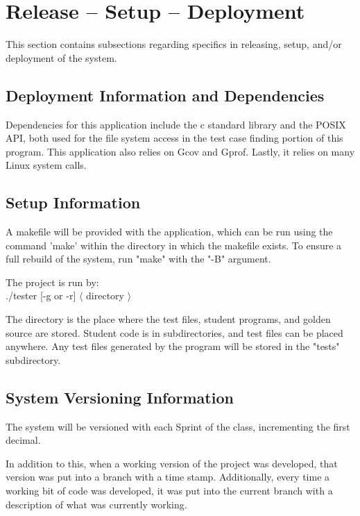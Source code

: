 
\chapter{Release -- Setup -- Deployment}
This section contains subsections regarding specifics in releasing, 
setup, and/or deployment of the system. 


\section{Deployment Information and Dependencies}
Dependencies for this application include the c standard library and the POSIX API, both used for the
file system access in the test case finding portion of this program. This application also relies on Gcov and Gprof. Lastly, it relies on many Linux system calls.



\section{Setup Information}
A makefile will be provided with the application, which can be run using the command 'make' within the 
directory in which the makefile exists. To ensure a full rebuild of the system, run "make" with the "-B" argument.

The project is run by: \\
./tester [-g or -r] $\langle$ directory $\rangle$

The directory is the place where the test files, student programs, and golden source are stored. Student code is in subdirectories, and test files can be placed anywhere. Any test files generated by the program will be stored in the "tests" subdirectory.


\section{System  Versioning Information}
The system will be versioned with each Sprint of the class, incrementing the first decimal.

In addition to this, when a working version of the project was developed, that version was put into a branch with a time stamp. 
Additionally, every time a working bit of code was developed, it was put into the current branch with 
a description of what was currently working.
